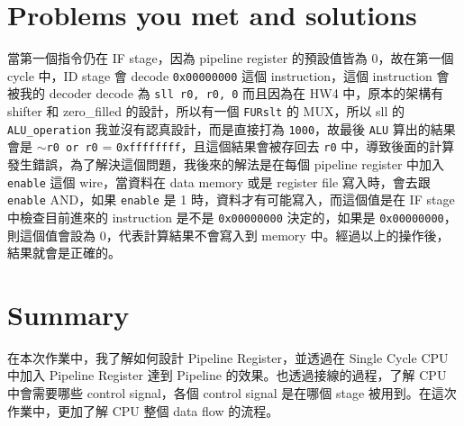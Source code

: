 \documentclass[twocolumn]{extarticle}
\begin{document}
\section{Problems you met and solutions}

當第一個指令仍在 IF stage，因為 pipeline register 的預設值皆為 0，故在第一個 cycle 中，ID stage 會 decode \texttt{0x00000000} 這個 instruction，這個 instruction 會被我的 decoder decode 為 \texttt{sll r0, r0, 0} 而且因為在 HW4 中，原本的架構有 shifter 和 zero\_filled 的設計，所以有一個 \texttt{FURslt} 的 MUX，所以 sll 的 \texttt{ALU\_operation} 我並沒有認真設計，而是直接打為 \texttt{1000}，故最後 \texttt{ALU} 算出的結果會是 \texttt{$\sim$r0 or r0} = \texttt{0xffffffff}，且這個結果會被存回去 \texttt{r0} 中，導致後面的計算發生錯誤，為了解決這個問題，我後來的解法是在每個 pipeline register 中加入 \texttt{enable} 這個 wire，當資料在 data memory 或是 register file 寫入時，會去跟 \texttt{enable} AND，如果 \texttt{enable} 是 1 時，資料才有可能寫入，而這個值是在 IF stage 中檢查目前進來的 instruction 是不是 \texttt{0x00000000} 決定的，如果是 \texttt{0x00000000}，則這個值會設為 0，代表計算結果不會寫入到 memory 中。經過以上的操作後，結果就會是正確的。

\section{Summary}

在本次作業中，我了解如何設計 Pipeline Register，並透過在 Single Cycle CPU 中加入 Pipeline Register 達到 Pipeline 的效果。也透過接線的過程，了解 CPU 中會需要哪些 control signal，各個 control signal 是在哪個 stage 被用到。在這次作業中，更加了解 CPU 整個 data flow 的流程。
\end{document}
